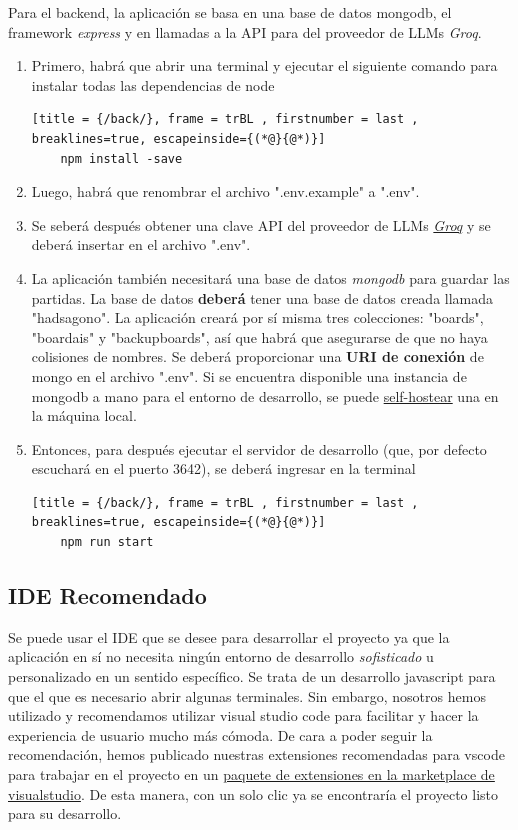 \documentclass[12pt,epsf,titlepage,a4paper]{article}
\begin{document}
Para el backend, la aplicación se basa en una base de datos mongodb, el framework \emph{express} y en llamadas a la API para del proveedor de LLMs \emph{Groq}.
\begin{enumerate}
    \item Primero, habrá que abrir una terminal y ejecutar el siguiente comando para instalar todas las dependencias de node
    \begin{lstlisting}[title = {/back/}, frame = trBL , firstnumber = last , breaklines=true, escapeinside={(*@}{@*)}]
    npm install -save
    \end{lstlisting}
    \item Luego, habrá que renombrar el archivo ".env.example" a ".env".
    \item Se seberá después obtener una clave API del proveedor de LLMs \href{https://console.groq.com}{\emph{Groq}} y se deberá insertar en el archivo ".env".
    \item La aplicación también necesitará una base de datos \emph{mongodb} para guardar las partidas. La base de datos \textbf{deberá} tener una base de datos creada llamada "hadsagono". La aplicación creará por sí misma tres colecciones: "boards", "boardais" y "backupboards", así que habrá que asegurarse de que no haya colisiones de nombres. Se deberá proporcionar una \textbf{URI de conexión} de mongo en el archivo ".env". Si se encuentra disponible una instancia de mongodb a mano para el entorno de desarrollo, se puede \href{https://www.mongodb.com/try/download/community}{self-hostear} una en la máquina local.
    \item Entonces, para después ejecutar el servidor de desarrollo (que, por defecto escuchará en el puerto 3642), se deberá ingresar en la terminal
    \begin{lstlisting}[title = {/back/}, frame = trBL , firstnumber = last , breaklines=true, escapeinside={(*@}{@*)}]
    npm run start
    \end{lstlisting}
    
\end{enumerate}

\subsection{IDE Recomendado}

Se puede usar el IDE que se desee para desarrollar el proyecto ya que la aplicación en sí no necesita ningún entorno de desarrollo \emph{sofisticado} u personalizado en un sentido específico. Se trata de un desarrollo javascript para que el que es necesario abrir algunas terminales. Sin embargo, nosotros hemos utilizado y recomendamos utilizar visual studio code \cite{vscode} para facilitar y hacer la experiencia de usuario mucho más cómoda.
De cara a poder seguir la recomendación, hemos publicado nuestras extensiones recomendadas para vscode para trabajar en el proyecto en un \href{https://marketplace.visualstudio.com/items?itemName=nicoagr.hadsagono-vscodeextensions}{paquete de extensiones en la marketplace de visualstudio}. De esta manera, con un solo clic ya se encontraría el proyecto listo para su desarrollo.
\end{document}
